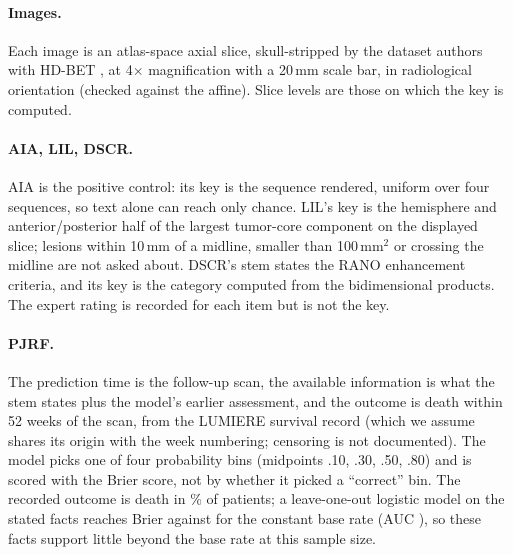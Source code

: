 \paragraph{Images.} Each image is an atlas-space axial slice, skull-stripped by the dataset authors with HD-BET \citep{isensee2019automated}, at 4$\times$ magnification with a 20\,mm scale bar, in radiological orientation (checked against the affine). Slice levels are those on which the key is computed.

\paragraph{AIA, LIL, DSCR.} AIA is the positive control: its key is the sequence rendered, uniform over four sequences, so text alone can reach only chance. LIL's key is the hemisphere and anterior/posterior half of the largest tumor-core component on the displayed slice; lesions within 10\,mm of a midline, smaller than 100\,mm$^2$ or crossing the midline are not asked about. DSCR's stem states the RANO enhancement criteria, and its key is the category computed from the bidimensional products. The expert rating is recorded for each item but is not the key.

\paragraph{PJRF.} The prediction time is the follow-up scan, the available information is what the stem states plus the model's earlier assessment, and the outcome is death within 52 weeks of the scan, from the LUMIERE survival record (which we assume shares its origin with the week numbering; censoring is not documented). The model picks one of four probability bins (midpoints .10, .30, .50, .80) and is scored with the Brier score, not by whether it picked a ``correct'' bin. The recorded outcome is death in \vfourPjrfBase{}\% of \vfourPjrfN{} patients; a leave-one-out logistic model on the stated facts reaches Brier \vfourPjrfBrierLR{} against \vfourPjrfBrierBase{} for the constant base rate (AUC \vfourPjrfAucLR{}), so these facts support little beyond the base rate at this sample size.

